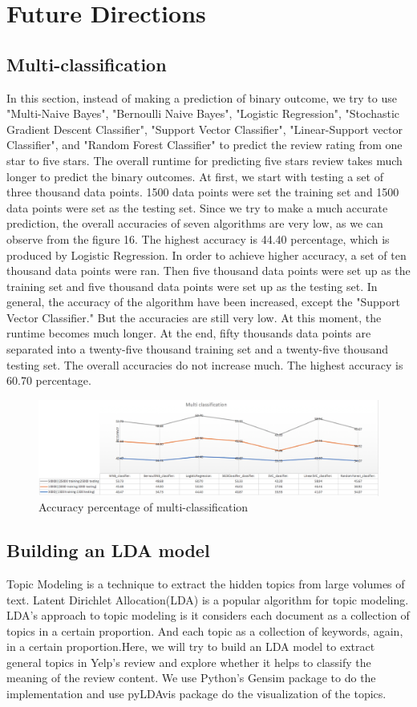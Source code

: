 \documentclass{article}
\begin{document}
\section{Future Directions}
\subsection{Multi-classification}
In this section, instead of making a prediction of binary outcome, we try to use "Multi-Naive Bayes", "Bernoulli Naive Bayes", "Logistic Regression", "Stochastic Gradient Descent Classifier", "Support Vector Classifier", "Linear-Support vector Classifier", and "Random Forest Classifier" to predict the review rating from one star to five stars. The overall runtime for predicting five stars review takes much longer to predict the binary outcomes. At first, we start with testing a set of three thousand data points. 1500 data points were set the training set and 1500 data points were set as the testing set. Since we try to make a much accurate prediction, the overall accuracies of seven algorithms are very low, as we can observe from the figure 16. The highest accuracy is 44.40 percentage, which is produced by Logistic Regression. In order to achieve higher accuracy, a set of ten thousand data points were ran. Then five thousand data points were set up as the training set and five thousand data points were set up as the testing set. In general, the accuracy of the algorithm have been increased, except the "Support Vector Classifier." But the accuracies are still very low. At this moment, the runtime becomes much longer. At the end, fifty thousands data points are separated into a twenty-five thousand training set and a twenty-five thousand testing set. The overall accuracies do not increase much. The highest accuracy is 60.70 percentage. 
\begin{figure}[!ht]
\centering
\includegraphics[width=\textwidth]{Multi.png}
\caption{Accuracy percentage of multi-classification}
\end{figure}
\subsection{Building an LDA model}
Topic Modeling is a technique to extract the hidden topics from large volumes of text. Latent Dirichlet Allocation(LDA) is a popular algorithm for topic modeling. LDA’s approach to topic modeling is it considers each document as a collection of topics in a certain proportion. And each topic as a collection of keywords, again, in a certain proportion.Here, we will try to build an LDA model to extract general topics in Yelp's review and explore whether it helps to classify the meaning of the review content. We use Python’s Gensim package to do the implementation and use pyLDAvis package do the visualization of the topics. 
\end{document}
